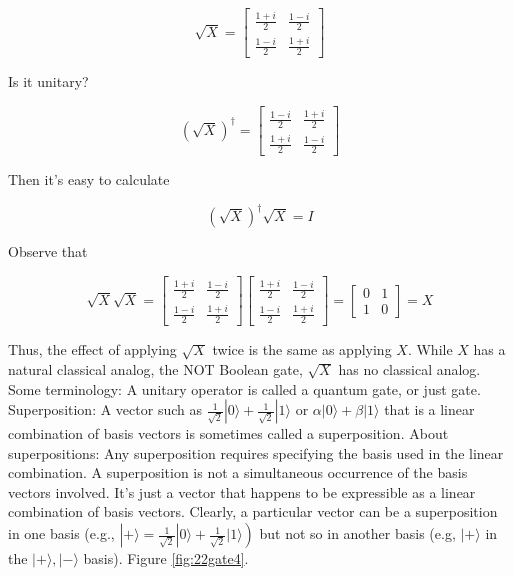 \documentclass[main.tex]{subfiles}
\begin{document}
    $$
    \sqrt{X}=\left[\begin{array}{cc}
    \frac{1+i}{2} & \frac{1-i}{2} \\
    \frac{1-i}{2} & \frac{1+i}{2}
    \end{array}\right]
    $$
    
    Is it unitary?
    
    $$
    (\sqrt{X})^{\dagger}=\left[\begin{array}{cc}
    \frac{1-i}{2} & \frac{1+i}{2} \\
    \frac{1+i}{2} & \frac{1-i}{2}
    \end{array}\right]
    $$
    
    Then it's easy to calculate
    
    $$
    (\sqrt{X})^{\dagger} \sqrt{X}=I
    $$
    
    Observe that
    
    $$
    \sqrt{X} \sqrt{X}=\left[\begin{array}{cc}
    \frac{1+i}{2} & \frac{1-i}{2} \\
    \frac{1-i}{2} & \frac{1+i}{2}
    \end{array}\right]\left[\begin{array}{cc}
    \frac{1+i}{2} & \frac{1-i}{2} \\
    \frac{1-i}{2} & \frac{1+i}{2}
    \end{array}\right]=\left[\begin{array}{ll}
    0 & 1 \\
    1 & 0
    \end{array}\right]=X
    $$
    
    Thus, the effect of applying $\sqrt{X}$ twice is the same as applying $X$. While $X$ has a natural classical analog, the NOT Boolean gate, $\sqrt{X}$ has no classical analog. Some terminology: A unitary operator is called a quantum gate, or just gate. Superposition: A vector such as $\frac{1}{\sqrt{2}}|0\rangle+\frac{1}{\sqrt{2}}|1\rangle$ or $\alpha|0\rangle+\beta|1\rangle$ that is a linear combination of basis vectors is sometimes called a superposition. About superpositions: Any superposition requires specifying the basis used in the linear combination. A superposition is not a simultaneous occurrence of the basis vectors involved. It's just a vector that happens to be expressible as a linear combination of basis vectors. Clearly, a particular vector can be a superposition in one basis (e.g., $\left.|+\rangle=\frac{1}{\sqrt{2}}|0\rangle+\frac{1}{\sqrt{2}}|1\rangle\right)$ but not so in another basis (e.g, $|+\rangle$ in the $|+\rangle,|-\rangle$ basis). Figure \ref{fig:22gate4}.
    
\end{document}
